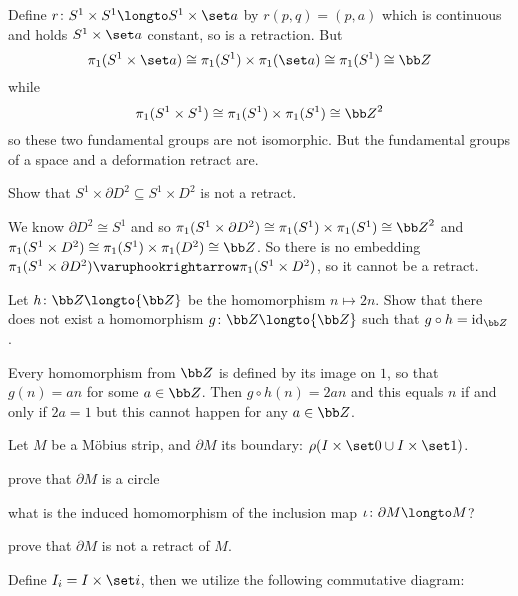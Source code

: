 \eexerc

Define $r\colon S^1\times S^1\longto S^1\times\set a$ by $r(p,q)=(p,a)$ which is continuous and holds $S^1\times\set a$ constant, so is a retraction.
But
$$ \pi_1(S^1\times\set a)\cong\pi_1(S^1)\times\pi_1(\set a)\cong\pi_1(S^1)\cong{\bb Z} $$
while
$$ \pi_1(S^1\times S^1)\cong\pi_1(S^1)\times\pi_1(S^1)\cong{\bb Z}^2 $$
so these two fundamental groups are not isomorphic.
But the fundamental groups of a space and a deformation retract are.

\bexerc

    Show that $S^1\times\partial D^2\subseteq S^1\times D^2$ is not a retract.

\eexerc

We know $\partial D^2\cong S^1$ and so $\pi_1(S^1\times\partial D^2)\cong\pi_1(S^1)\times\pi_1(S^1)\cong{\bb Z}^2$ and $\pi_1(S^1\times D^2)\cong\pi_1(S^1)\times\pi_1(D^2)\cong{\bb Z}$.
So there is no embedding $\pi_1(S^1\times\partial D^2)\varuphookrightarrow\pi_1(S^1\times D^2)$, so it cannot be a retract.

\bexerc

    Let $h\colon{\bb Z}\longto{\bb Z}$ be the homomorphism $n\mapsto2n$.
    Show that there does not exist a homomorphism $g\colon{\bb Z}\longto{\bb Z}$ such that $g\circ h={\rm id}_{\bb Z}$.

\eexerc

Every homomorphism from ${\bb Z}$ is defined by its image on $1$, so that $g(n)=an$ for some $a\in{\bb Z}$.
Then $g\circ h(n)=2an$ and this equals $n$ if and only if $2a=1$ but this cannot happen for any $a\in{\bb Z}$.

\bexerc

    Let $M$ be a M\"obius strip, and $\partial M$ its boundary: $\rho(I\times\set0\cup I\times\set1)$.
    \benum
        \item prove that $\partial M$ is a circle
        \item what is the induced homomorphism of the inclusion map $\iota\colon\partial M\longto M$?
        \item prove that $\partial M$ is not a retract of $M$.
    \eenum

\eexerc

\benum
    \item Define $I_i=I\times\set i$, then we utilize the following commutative diagram:

    \medskip
    \centerline{\def\diagrowheight{1cm}\def\diagcolwidth{1cm}\def\diagcolbuf{.5cm}}

